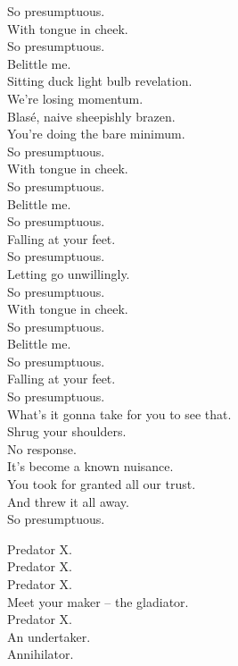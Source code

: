 So presumptuous. \\
With tongue in cheek. \\
So presumptuous. \\
Belittle me. \\

Sitting duck light bulb revelation. \\
We're losing momentum. \\
Blasé, naive sheepishly brazen. \\
You're doing the bare minimum. \\

So presumptuous. \\
With tongue in cheek. \\
So presumptuous. \\
Belittle me. \\
So presumptuous. \\
Falling at your feet. \\
So presumptuous. \\
Letting go unwillingly. \\

So presumptuous. \\
With tongue in cheek. \\
So presumptuous. \\
Belittle me. \\
So presumptuous. \\
Falling at your feet. \\
So presumptuous. \\
What's it gonna take for you to see that. \\

Shrug your shoulders. \\
No response. \\
It's become a known nuisance. \\
You took for granted all our trust. \\
And threw it all away. \\
So presumptuous. \\




Predator X. \\
Predator X. \\
Predator X. \\
Meet your maker -- the gladiator. \\
Predator X. \\
An undertaker. \\
Annihilator. \\

